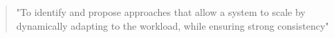 \begin{quote}
"To identify and propose approaches that allow a system to scale by dynamically
adapting to the workload, while ensuring strong consistency"
\end{quote}




